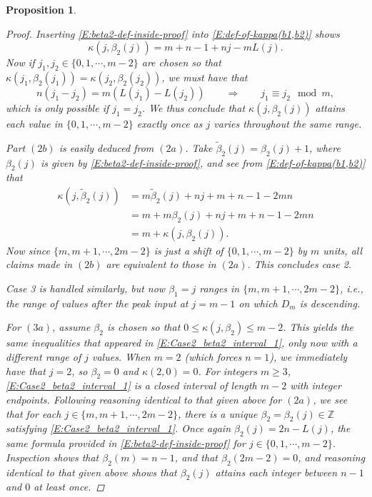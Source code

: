 \documentclass[10pt,a4paper]{amsart}
\newtheorem{proposition}{Proposition}
\newcommand{\Z}{{\mathbb Z}}
\begin{document}
\begin{proposition}
\begin{proof}
Inserting \eqref{E:beta2-def-inside-proof} into \eqref{E:def-of-kappa(b1,b2)} shows 
\begin{equation*}
\kappa(j,\beta_2(j)) = m+n-1+nj-mL(j).
\end{equation*}
Now if $j_1,j_2 \in \{0,1,\cdots,m-2\}$ are chosen so that $\kappa(j_1,\beta_2(j_1)) = \kappa(j_2,\beta_2(j_2))$, we must have that
\begin{equation*}
n(j_1-j_2) = m(L(j_1)-L(j_2)) \qquad \Longrightarrow \qquad j_1 \equiv j_2 \mod m,
\end{equation*}
which is only possible if $j_1=j_2$.
We thus conclude that $\kappa(j,\beta_2(j))$ attains each value in $\{0,1,\cdots,m-2 \}$ exactly once as $j$ varies throughout the same range.

Part $(2b)$ is easily deduced from $(2a)$. 
Take $\tilde\beta_2(j) = \beta_2(j)+1$, where $\beta_2(j)$ is given by \eqref{E:beta2-def-inside-proof}, and see from \eqref{E:def-of-kappa(b1,b2)} that
\begin{align*}
\kappa(j,\tilde\beta_2(j)) &= m \tilde\beta_2(j) + nj + m + n - 1 - 2mn \\
&= m + m\beta_2(j) + nj + m + n - 1 - 2mn \\
&= m + \kappa(j,\beta_2(j)).
\end{align*}
Now since $\{m,m+1,\cdots,2m-2 \}$ is just a shift of $\{0,1,\cdots,m-2 \}$ by $m$ units, all claims made in $(2b)$ are equivalent to those in $(2a)$.
This concludes case 2.

Case 3 is handled similarly, but now $\beta_1 = j$ ranges in $\{m,m+1,\cdots,2m-2\}$, i.e., the range of values after the peak input at $j=m-1$ on which $D_m$ is descending.

For $(3a)$, assume $\beta_2$ is chosen so that $0 \le \kappa(j,\beta_2) \le m-2$.
This yields the same inequalities that appeared in \eqref{E:Case2_beta2_interval_1}, only now with a different range of $j$ values.
When $m=2$ (which forces $n=1$), we immediately have that $j=2$, so $\beta_2 = 0$ and $\kappa(2,0) = 0$.
For integers $m \ge 3$, \eqref{E:Case2_beta2_interval_1} is a closed interval of length $m-2$ with integer endpoints.
Following reasoning identical to that given above for $(2a)$, we see that for each $j \in \{m,m+1,\cdots,2m-2\}$, there is a unique $\beta_2 = \beta_2(j) \in \Z$ satisfying \eqref{E:Case2_beta2_interval_1}.
Once again $\beta_2(j) = 2n - L(j)$, the same formula provided in \eqref{E:beta2-def-inside-proof} for $j \in  \{0,1,\cdots,m-2 \}$.
Inspection shows that $\beta_2(m) = n-1$, and that $\beta_2(2m-2) = 0$, and reasoning identical to that given above shows that $\beta_2(j)$ attains each integer between $n-1$ and $0$ at least once.


\end{proof}
\end{proposition}
\end{document}

